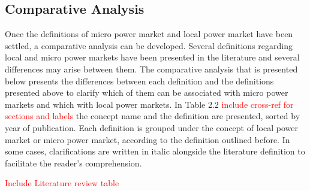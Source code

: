\subsection{Comparative Analysis}
Once the definitions of micro power market and local power market have been settled, a comparative analysis can be developed. Several definitions regarding local and micro power markets have been presented in the literature and several differences may arise between them. The comparative analysis that is presented below presents the differences between each definition and the definitions presented above to clarify which of them can be associated with micro power markets and which with local power markets. In Table 2.2 \textcolor{red}{include cross-ref for sections and labels} the
concept name and the definition are presented, sorted by year of publication. Each definition is grouped under the concept of local power market or micro power market, according to the definition outlined before. In some cases, clarifications are written in italic alongside the literature definition to facilitate the reader's comprehension.

\textcolor{red}{Include Literature review table}

